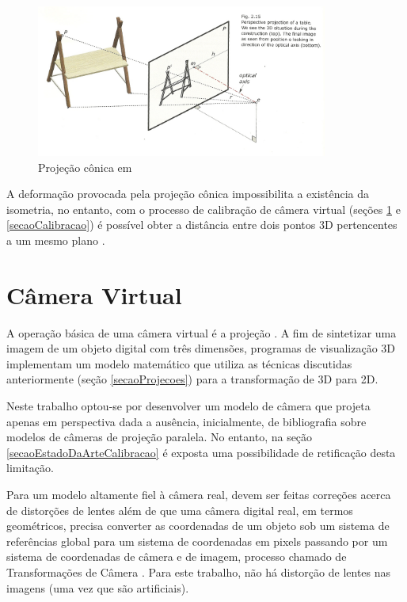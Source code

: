 			\begin{figure}[!htb]
				\centering
				\includegraphics[height=5cm]{imagens/projecaoConica.jpg}
				\caption{Projeção cônica em \cite{archiGeoBook}}
				\label{imagemProjecaoConica}
			\end{figure}
			
			A deformação provocada pela projeção cônica impossibilita a existência da isometria, no entanto, com o processo de calibração de câmera virtual (seções \ref{secaoCamera} e \ref{secaoCalibracao}) é possível obter a distância entre dois pontos 3D pertencentes a um mesmo plano \cite{juizVirtual}.
	
	\section{Câmera Virtual}
		\label{secaoCamera}
	
		A operação básica de uma câmera virtual é a projeção \cite{fundCompGraf}. A fim de sintetizar uma imagem de um objeto digital com três dimensões, programas de visualização 3D implementam um modelo matemático que utiliza as técnicas discutidas anteriormente (seção \ref{secaoProjecoes}) para a transformação de 3D para 2D.
		
		Neste trabalho optou-se por desenvolver um modelo de câmera que projeta apenas em perspectiva dada a ausência, inicialmente, de bibliografia sobre modelos de câmeras de projeção paralela. No entanto, na seção \ref{secaoEstadoDaArteCalibracao} é exposta uma possibilidade de retificação desta limitação.
		
		Para um modelo altamente fiel à câmera real, devem ser feitas correções acerca de distorções de lentes \cite{animation} além de que uma câmera digital real, em termos geométricos, precisa converter as coordenadas de um objeto sob um sistema de referências global para um sistema de coordenadas em pixels passando por um sistema de coordenadas de câmera e de imagem, processo chamado de Transformações de Câmera \cite{foto3D}. Para este trabalho, não há distorção de lentes nas imagens (uma vez que são artificiais).
		
